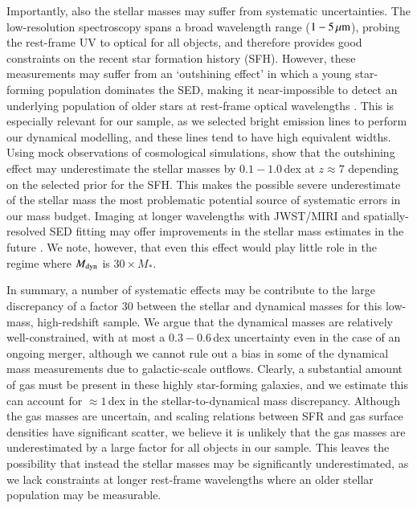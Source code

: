 \documentclass[longauth]{aa}
\newcommand{\Mdyn}{M_{\rm dyn}}
\newcommand{\micron}{\rm \mu m}
\begin{document}
Importantly, also the stellar masses may suffer from systematic uncertainties. The low-resolution spectroscopy spans a broad wavelength range ($1-5\,\micron$), probing the rest-frame UV to optical for all objects, and therefore provides good constraints on the recent star formation history (SFH). However, these measurements may suffer from an `outshining effect' in which a young star-forming population dominates the SED, making it near-impossible to detect an underlying population of older stars at rest-frame optical wavelengths \citep[e.g.,][]{Maraston2010,Pforr2012,Sorba2018,Gimenez2023,Tacchella2023,Whitler2023}. This is especially relevant for our sample, as we selected bright emission lines to perform our dynamical modelling, and these lines tend to have high equivalent widths. Using mock observations of cosmological simulations, \citet{Narayanan2023} show that the outshining effect may underestimate the stellar masses by $0.1-1.0$\,dex at $z\approx 7$ depending on the selected prior for the SFH. 
This makes the possible severe underestimate of the stellar mass the most problematic potential source of systematic errors in our mass budget. Imaging at longer wavelengths with JWST/MIRI and spatially-resolved SED fitting may offer improvements in the stellar mass estimates in the future \citep[e.g.,][]{Abdurrouf2023,Gimenez2023,Perez2023}. We note, however, that even this effect would play little role in the regime where $\Mdyn$ is $30\times M_*$.

In summary, a number of systematic effects may be contribute to the large discrepancy of a factor 30 between the stellar and dynamical masses for this low-mass, high-redshift sample. We argue that the dynamical masses are relatively well-constrained, with at most a $0.3-0.6\,$dex uncertainty even in the case of an ongoing merger, although we cannot rule out a bias in some of the dynamical mass measurements due to galactic-scale outflows. Clearly, a substantial amount of gas must be present in these highly star-forming galaxies, and we estimate this can account for $\approx1\,$dex in the stellar-to-dynamical mass discrepancy. Although the gas masses are uncertain, and scaling relations between SFR and gas surface densities have significant scatter, we believe it is unlikely that the gas masses are underestimated by a large factor for all objects in our sample. This leaves the possibility that instead the stellar masses may be significantly underestimated, as we lack constraints at longer rest-frame wavelengths where an older stellar population may be measurable.
\end{document}
